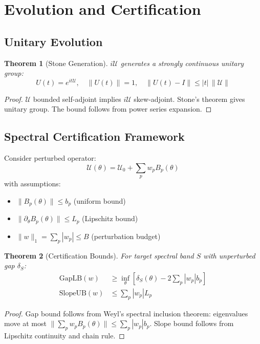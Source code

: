 \documentclass[10pt]{article}
\newtheorem{theorem}{Theorem}
\newcommand{\UU}{\mathcal{U}}
\begin{document}
\section{Evolution and Certification}

\subsection{Unitary Evolution}

\begin{theorem}[Stone Generation]
$i\UU$ generates a strongly continuous unitary group:
\[
U(t) = e^{it\UU},\quad \|U(t)\| = 1,\quad \|U(t) - I\| \leq |t|\,\|\UU\|
\]
\end{theorem}

\begin{proof}
$\UU$ bounded self-adjoint implies $i\UU$ skew-adjoint. Stone's theorem gives unitary group. The bound follows from power series expansion.
\end{proof}

\subsection{Spectral Certification Framework}

Consider perturbed operator:
\[
\UU(\theta) = \UU_0 + \sum_p w_p B_p(\theta)
\]
with assumptions:
\begin{itemize}
    \item $\|B_p(\theta)\| \leq b_p$ (uniform bound)
    \item $\|\partial_\theta B_p(\theta)\| \leq L_p$ (Lipschitz bound)  
    \item $\|w\|_1 = \sum_p |w_p| \leq B$ (perturbation budget)
\end{itemize}

\begin{theorem}[Certification Bounds]
For target spectral band $S$ with unperturbed gap $\delta_S$:
\begin{align*}
\text{GapLB}(w) &\geq \inf_\theta \left[\delta_S(\theta) - 2\sum_p |w_p| b_p\right] \\
\text{SlopeUB}(w) &\leq \sum_p |w_p| L_p
\end{align*}
\end{theorem}

\begin{proof}
Gap bound follows from Weyl's spectral inclusion theorem: eigenvalues move at most $\|\sum_p w_p B_p(\theta)\| \leq \sum_p |w_p| b_p$. Slope bound follows from Lipschitz continuity and chain rule.
\end{proof}
\end{document}
